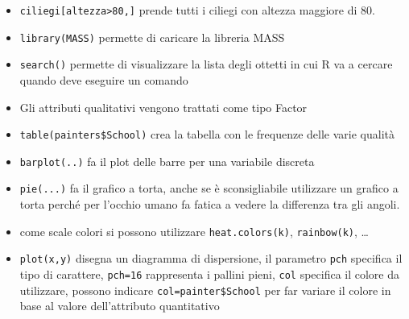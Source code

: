 \begin{itemize}
\item
  \texttt{ciliegi{[}altezza\textgreater{}80,{]}} prende tutti i ciliegi
  con altezza maggiore di 80.
\item
  \texttt{library(MASS)} permette di caricare la libreria MASS
\item
  \texttt{search()} permette di visualizzare la lista degli ottetti in
  cui R va a cercare quando deve eseguire un comando
\item
  Gli attributi qualitativi vengono trattati come tipo Factor
\item
  \texttt{table(painters\$School)} crea la tabella con le frequenze
  delle varie qualità
\item
  \texttt{barplot(..)} fa il plot delle barre per una variabile discreta
\item
  \texttt{pie(...)} fa il grafico a torta, anche se è sconsigliabile
  utilizzare un grafico a torta perché per l'occhio umano fa fatica a
  vedere la differenza tra gli angoli.
\item
  come scale colori si possono utilizzare \texttt{heat.colors(k)},
  \texttt{rainbow(k)}, \ldots{}
\item
  \texttt{plot(x,y)} disegna un diagramma di dispersione, il parametro
  \texttt{pch} specifica il tipo di carattere, \texttt{pch=16}
  rappresenta i pallini pieni, \texttt{col} specifica il colore da
  utilizzare, possono indicare \texttt{col=painter\$School} per far
  variare il colore in base al valore dell'attributo quantitativo
\end{itemize}
